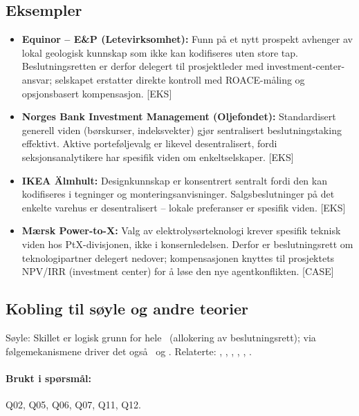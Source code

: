 \subsection*{Eksempler}
\begin{itemize}
\item \textbf{Equinor -- E\&P (Letevirksomhet):} Funn på et nytt prospekt avhenger av lokal geologisk kunnskap som ikke kan kodifiseres uten store tap. Beslutningsretten er derfor delegert til prosjektleder med investment-center-ansvar; selskapet erstatter direkte kontroll med ROACE-måling og opsjonsbasert kompensasjon. [EKS]
\item \textbf{Norges Bank Investment Management (Oljefondet):} Standardisert generell viden (børskurser, indeksvekter) gjør sentralisert beslutningstaking effektivt. Aktive porteføljevalg er likevel desentralisert, fordi seksjonsanalytikere har spesifik viden om enkeltselskaper. [EKS]
\item \textbf{IKEA Älmhult:} Designkunnskap er konsentrert sentralt fordi den kan kodifiseres i tegninger og monteringsanvisninger. Salgsbeslutninger på det enkelte varehus er desentralisert -- lokale preferanser er spesifik viden. [EKS]
\item \textbf{Mærsk Power-to-X:} Valg av elektrolysørteknologi krever spesifik teknisk viden hos PtX-divisjonen, ikke i konsernledelsen. Derfor er beslutningsrett om teknologipartner delegert nedover; kompensasjonen knyttes til prosjektets NPV/IRR (investment center) for å løse den nye agentkonflikten. [CASE]
\end{itemize}

\subsection*{Kobling til søyle og andre teorier}
Søyle: Skillet er logisk grunn for hele \SOne\ (allokering av beslutningsrett); via følgemekanismene driver det også \STwo\ og \SThree. Relaterte: , , , , , .

\paragraph{Brukt i spørsmål:} Q02, Q05, Q06, Q07, Q11, Q12.
